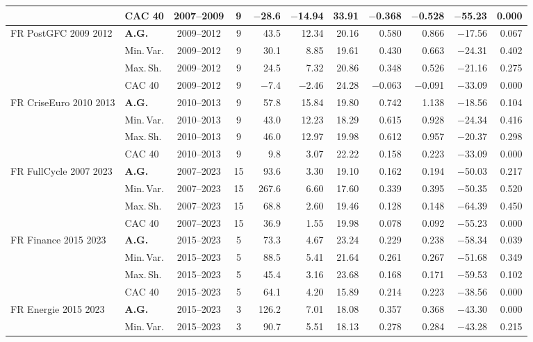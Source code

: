 \begin{longtable}{p{2.6cm} l c c r r r r r r r}
 & CAC 40 & 2007--2009 & 9 & $-$28.6 & $-$14.94 & 33.91 & $-$0.368 & $-$0.528 & $-$55.23 & 0.000 \\
\midrule
FR PostGFC 2009 2012 & \textbf{A.G.} & 2009--2012 & 9 & 43.5 & 12.34 & 20.16 & 0.580 & 0.866 & $-$17.56 & 0.067 \\
 & Min.\,Var. & 2009--2012 & 9 & 30.1 & 8.85 & 19.61 & 0.430 & 0.663 & $-$24.31 & 0.402 \\
 & Max.\,Sh. & 2009--2012 & 9 & 24.5 & 7.32 & 20.86 & 0.348 & 0.526 & $-$21.16 & 0.275 \\
 & CAC 40 & 2009--2012 & 9 & $-$7.4 & $-$2.46 & 24.28 & $-$0.063 & $-$0.091 & $-$33.09 & 0.000 \\
\midrule
FR CriseEuro 2010 2013 & \textbf{A.G.} & 2010--2013 & 9 & 57.8 & 15.84 & 19.80 & 0.742 & 1.138 & $-$18.56 & 0.104 \\
 & Min.\,Var. & 2010--2013 & 9 & 43.0 & 12.23 & 18.29 & 0.615 & 0.928 & $-$24.34 & 0.416 \\
 & Max.\,Sh. & 2010--2013 & 9 & 46.0 & 12.97 & 19.98 & 0.612 & 0.957 & $-$20.37 & 0.298 \\
 & CAC 40 & 2010--2013 & 9 & 9.8 & 3.07 & 22.22 & 0.158 & 0.223 & $-$33.09 & 0.000 \\
\midrule
FR FullCycle 2007 2023 & \textbf{A.G.} & 2007--2023 & 15 & 93.6 & 3.30 & 19.10 & 0.162 & 0.194 & $-$50.03 & 0.217 \\
 & Min.\,Var. & 2007--2023 & 15 & 267.6 & 6.60 & 17.60 & 0.339 & 0.395 & $-$50.35 & 0.520 \\
 & Max.\,Sh. & 2007--2023 & 15 & 68.8 & 2.60 & 19.46 & 0.128 & 0.148 & $-$64.39 & 0.450 \\
 & CAC 40 & 2007--2023 & 15 & 36.9 & 1.55 & 19.98 & 0.078 & 0.092 & $-$55.23 & 0.000 \\
\midrule
FR Finance 2015 2023 & \textbf{A.G.} & 2015--2023 & 5 & 73.3 & 4.67 & 23.24 & 0.229 & 0.238 & $-$58.34 & 0.039 \\
 & Min.\,Var. & 2015--2023 & 5 & 88.5 & 5.41 & 21.64 & 0.261 & 0.267 & $-$51.68 & 0.349 \\
 & Max.\,Sh. & 2015--2023 & 5 & 45.4 & 3.16 & 23.68 & 0.168 & 0.171 & $-$59.53 & 0.102 \\
 & CAC 40 & 2015--2023 & 5 & 64.1 & 4.20 & 15.89 & 0.214 & 0.223 & $-$38.56 & 0.000 \\
\midrule
FR Energie 2015 2023 & \textbf{A.G.} & 2015--2023 & 3 & 126.2 & 7.01 & 18.08 & 0.357 & 0.368 & $-$43.30 & 0.000 \\
 & Min.\,Var. & 2015--2023 & 3 & 90.7 & 5.51 & 18.13 & 0.278 & 0.284 & $-$43.28 & 0.215 \\

\end{longtable}
